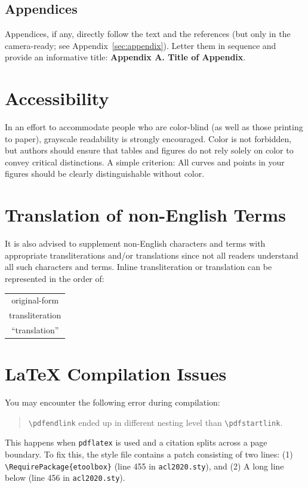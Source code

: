 \documentclass[11pt,a4paper]{article}
\begin{document}
\subsection{Appendices}
Appendices, if any, directly follow the text and the
references (but only in the camera-ready; see Appendix~\ref{sec:appendix}).
Letter them in sequence and provide an informative title:
\textbf{Appendix A. Title of Appendix}.

\section{Accessibility}
\label{ssec:accessibility}

In an effort to accommodate people who are color-blind (as well as those printing to paper), grayscale readability is strongly encouraged.
Color is not forbidden, but authors should ensure that tables and figures do not rely solely on color to convey critical distinctions.
A simple criterion:
All curves and points in your figures should be clearly distinguishable without color.

\section{Translation of non-English Terms}

It is also advised to supplement non-English characters and terms with appropriate transliterations and/or translations since not all readers understand all such characters and terms.
Inline transliteration or translation can be represented in the order of:
\begin{center}
  \begin{tabular}{c}
    original-form   \\
    transliteration \\
    ``translation''
  \end{tabular}
\end{center}

\section{\LaTeX{} Compilation Issues}
You may encounter the following error during compilation:
\begin{quote}
  {\small\verb|\pdfendlink|} ended up in different nesting level than {\small\verb|\pdfstartlink|}.
\end{quote}
This happens when \texttt{\small pdflatex} is used and a citation splits across a page boundary.
To fix this, the style file contains a patch consisting of two lines:
(1) {\small\verb|\RequirePackage{etoolbox}|} (line 455 in \texttt{\small acl2020.sty}), and
(2) A long line below (line 456 in \texttt{\small acl2020.sty}).
\end{document}
